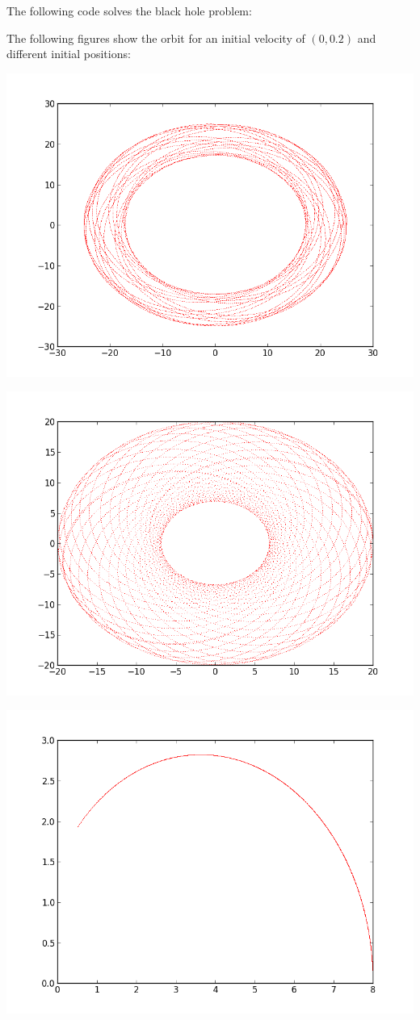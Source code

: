 \documentclass[%
]
{scrartcl}
\theoremstyle{plain}
\begin{document}
The following code solves the black hole problem:



The following figures show the orbit for an initial velocity of $(0, 0.2)$ and different initial positions:

\begin{center}
\centering
\includegraphics[width=0.6\linewidth]{../blackHole25.png}
\end{center}

\begin{center}
\centering
\includegraphics[width=0.6\linewidth]{../blackHole20.png}
\end{center}

\begin{center}
\centering
\includegraphics[width=0.6\linewidth]{../blackHole8.png}
\end{center}

%
\end{document}
